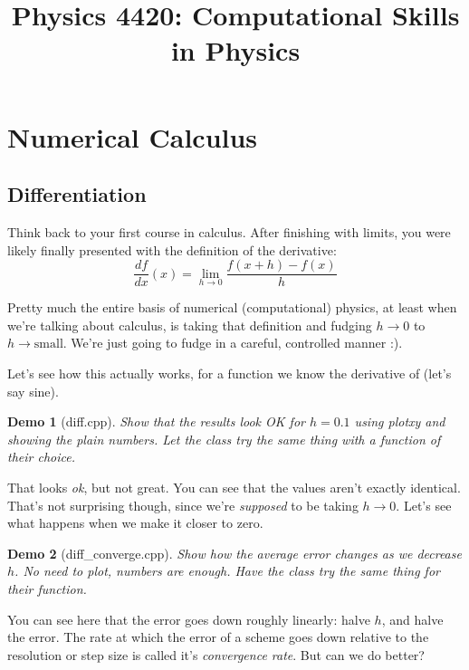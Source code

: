 \documentclass{article}
\theoremstyle{demo}
\newtheorem{demo}{Demo}[section]
\begin{document}
\title{Physics 4420: Computational Skills in Physics}
\maketitle
\section{Numerical Calculus}
\subsection{Differentiation}
Think back to your first course in calculus.  After finishing with limits, you
were likely finally presented with the definition of the derivative:
\begin{equation}
    \frac{df}{dx}(x) = \lim_{h\to 0} \frac{f(x+h)-f(x)}{h}
\end{equation}

Pretty much the entire basis of numerical (computational) physics, at least when
we're talking about calculus, is taking that definition and fudging
$h\rightarrow 0$ to $h\rightarrow\textrm{small}$.  We're just going to fudge in
a careful, controlled manner :).

Let's see how this actually works, for a function we know the derivative of
(let's say sine).

\begin{demo}[diff.cpp]
    Show that the results look OK for $h=0.1$ using \textit{plotxy} and showing
    the plain numbers.  Let the class try the same thing with a function of
    their choice.
\end{demo}

That looks \textit{ok}, but not great.  You can see that the values aren't
exactly identical.  That's not surprising though, since we're \textit{supposed}
to be taking $h\rightarrow0$.  Let's see what happens when we make it closer to
zero.

\begin{demo}[diff\_converge.cpp]
    Show how the average error changes as we decrease $h$. No need to plot,
    numbers are enough.  Have the class try the same thing for their function.
\end{demo}

You can see here that the error goes down roughly linearly: halve $h$, and halve
the error.  The rate at which the error of a scheme goes down relative to the
resolution or step size is called it's \textit{convergence rate}.
But can we do better?
\end{document}
